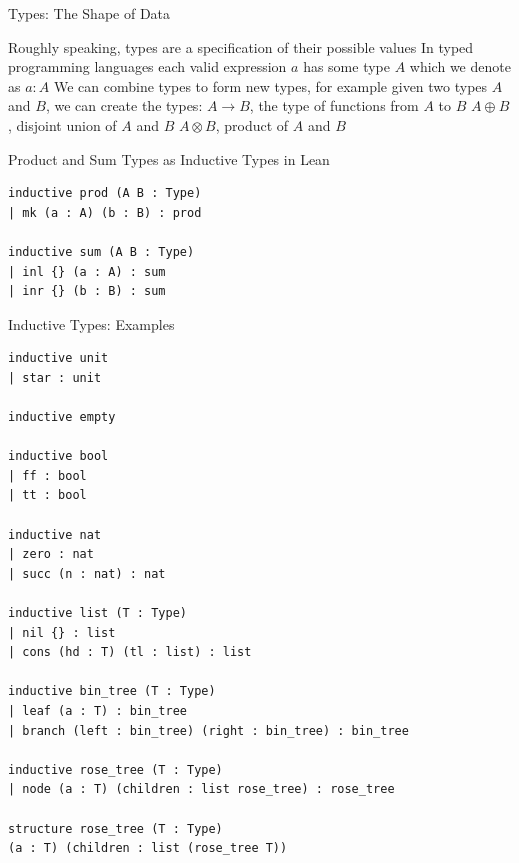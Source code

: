 \documentclass[pdf]{beamer}
\begin{document}
\begin{frame}{Types: The Shape of Data}
  \begin{outline}
    \1 Roughly speaking, types are a specification of their possible values
    \1 In typed programming languages each valid expression $a$ has some type $A$ which we denote as $a : A$
    \1 We can combine types to form new types, for example given two types $A$ and $B$, we can create the types:
    \2 $A \to B$, the type of functions from $A$ to $B$
    \2 $A \oplus B$, disjoint union of $A$ and $B$
    \2 $A \otimes B$, product of $A$ and $B$
  \end{outline}
\end{frame}

\begin{frame}[fragile]{Product and Sum Types as Inductive Types in Lean}
  \begin{verbatim}
inductive prod (A B : Type)
| mk (a : A) (b : B) : prod

inductive sum (A B : Type)
| inl {} (a : A) : sum
| inr {} (b : B) : sum
  \end{verbatim}
\end{frame}

\begin{frame}[fragile]{Inductive Types: Examples}
  \begin{verbatim}
inductive unit
| star : unit

inductive empty

inductive bool
| ff : bool
| tt : bool

inductive nat
| zero : nat
| succ (n : nat) : nat

inductive list (T : Type)
| nil {} : list
| cons (hd : T) (tl : list) : list

inductive bin_tree (T : Type)
| leaf (a : T) : bin_tree
| branch (left : bin_tree) (right : bin_tree) : bin_tree

inductive rose_tree (T : Type)
| node (a : T) (children : list rose_tree) : rose_tree

structure rose_tree (T : Type)
(a : T) (children : list (rose_tree T))
  \end{verbatim}
\end{frame}
\end{document}
